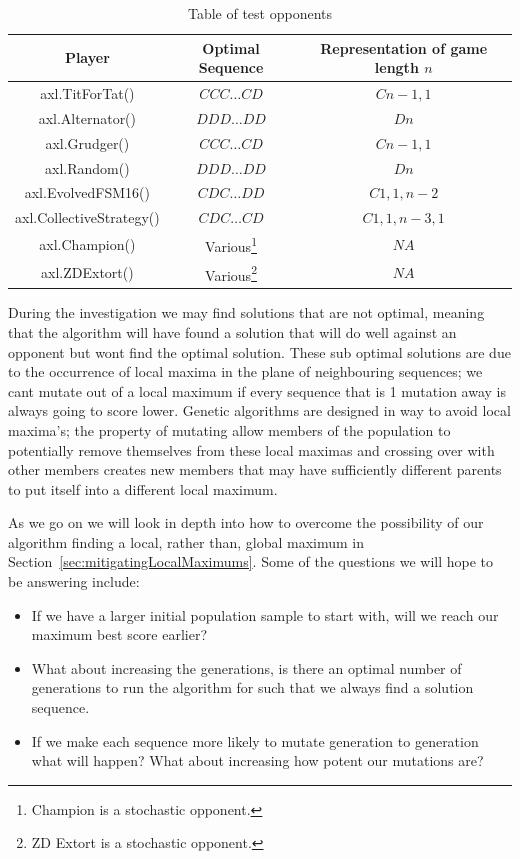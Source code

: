\begin{table}
    \centering
    \begin{tabular}{ccc}
        \toprule
        Player & Optimal Sequence & Representation of game length $n$\\
        \midrule
        axl.TitForTat()&\(CCC\ldots CD\)& $Cn-1,1$\\
        axl.Alternator()&\(DDD\ldots DD\)&$Dn$\\
        axl.Grudger()&\(CCC\ldots CD\)&$Cn-1,1$\\
        axl.Random()&\(DDD\ldots DD\)&$Dn$\\
        axl.EvolvedFSM16()& $CDC\ldots DD$ & $C1,1,n-2$\\
        axl.CollectiveStrategy()&$CDC\ldots CD$&$C1,1,n-3,1$\\
        axl.Champion()& Various\footnote{Champion is a stochastic opponent.} & $NA$\\
        axl.ZDExtort()& Various\footnote{ZD Extort is a stochastic opponent.} & $NA$\\
        \bottomrule
    \end{tabular}
    \caption{Table of test opponents}\label{table:table_test_opsponents}
\end{table}

During the investigation we may find solutions that are not optimal, meaning that the algorithm will have found a solution that will do well against an opponent but wont find the optimal solution.
These sub optimal solutions are due to the occurrence of local maxima in the plane of neighbouring sequences; we cant mutate out of a local maximum if every sequence that is 1 mutation away is always going to score lower.
Genetic algorithms are designed in way to avoid local maxima's;
the property of mutating allow members of the population to potentially remove themselves from these local maximas and crossing over with other members creates new members that may have sufficiently different parents to put itself into a different local maximum.

As we go on we will look in depth into how to overcome the possibility of our algorithm finding a local, rather than, global maximum in Section~\ref{sec:mitigatingLocalMaximums}.
Some of the questions we will hope to be answering include:
\begin{itemize}
    \item If we have a larger initial population sample to start with, will we reach our maximum best score earlier?
    \item What about increasing the generations, is there an optimal number of generations to run the algorithm for such that we always find a solution sequence.
    \item If we make each sequence more likely to mutate generation to generation what will happen?
    What about increasing how potent our mutations are?
\end{itemize}

